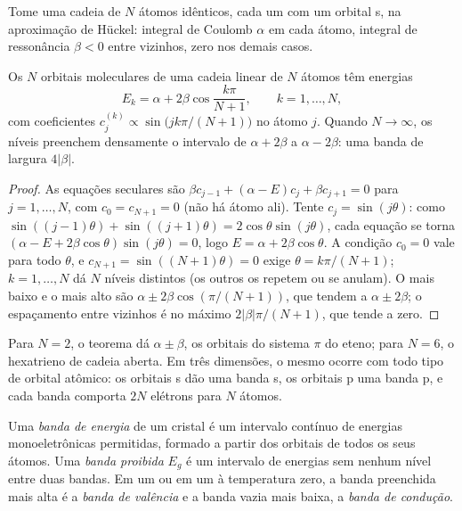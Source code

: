 Tome uma cadeia de $N$ átomos idênticos, cada um com um orbital s, na aproximação de
Hückel: integral de Coulomb $\alpha$ em cada átomo, integral de ressonância $\beta < 0$
entre vizinhos, zero nos demais casos.

\begin{theorem}\label{thm:b3:solid-state:chain}
Os $N$ orbitais moleculares de uma cadeia linear de $N$ átomos têm energias
\[
  E_k = \alpha + 2\beta\cos\frac{k\pi}{N + 1}, \qquad k = 1, \dots, N,
\]
com coeficientes $c_j^{(k)} \propto \sin\bigl(jk\pi/(N + 1)\bigr)$ no átomo $j$. Quando $N \to \infty$, os níveis preenchem
densamente o intervalo de $\alpha + 2\beta$ a $\alpha - 2\beta$: uma banda de largura $4|\beta|$.
\end{theorem}

\begin{proof}
As equações seculares são $\beta c_{j-1} + (\alpha - E)c_j + \beta c_{j+1} = 0$ para $j = 1, \dots, N$, com $c_0 = c_{N+1} = 0$
(não há átomo ali). Tente $c_j = \sin(j\theta)$: como $\sin((j - 1)\theta) + \sin((j + 1)\theta) = 2\cos\theta\sin(j\theta)$, cada
equação se torna $(\alpha - E + 2\beta\cos\theta)\sin(j\theta) = 0$, logo $E = \alpha + 2\beta\cos\theta$. A condição $c_0 = 0$ vale
para todo $\theta$, e $c_{N+1} = \sin((N + 1)\theta) = 0$ exige $\theta = k\pi/(N + 1)$; $k = 1, \dots, N$ dá $N$ níveis
distintos (os outros os repetem ou se anulam). O mais baixo e o mais alto são
$\alpha \pm 2\beta\cos(\pi/(N + 1))$, que tendem a $\alpha \pm 2\beta$; o espaçamento entre vizinhos é no máximo
$2|\beta|\pi/(N + 1)$, que tende a zero.
\end{proof}

Para $N = 2$, o teorema dá $\alpha \pm \beta$, os orbitais do sistema $\pi$ do eteno; para
$N = 6$, o hexatrieno de cadeia aberta. Em três dimensões, o mesmo ocorre com
todo tipo de orbital atômico: os orbitais s dão uma banda s, os orbitais p uma banda p,
e cada banda comporta $2N$ elétrons para $N$ átomos.

\begin{definition}[Bandas]\label{def:b3:solid-state:band}
Uma \emph{banda de energia} de um cristal é um intervalo contínuo de
energias monoeletrônicas permitidas, formado a partir dos orbitais de todos os seus átomos. Uma
\emph{banda proibida} $E_g$ é um intervalo de energias sem nenhum nível entre duas
bandas. Em um  ou em um  à temperatura zero, a banda preenchida
mais alta é a \emph{banda de valência} e a banda vazia mais
baixa, a \emph{banda de condução}.
\end{definition}

